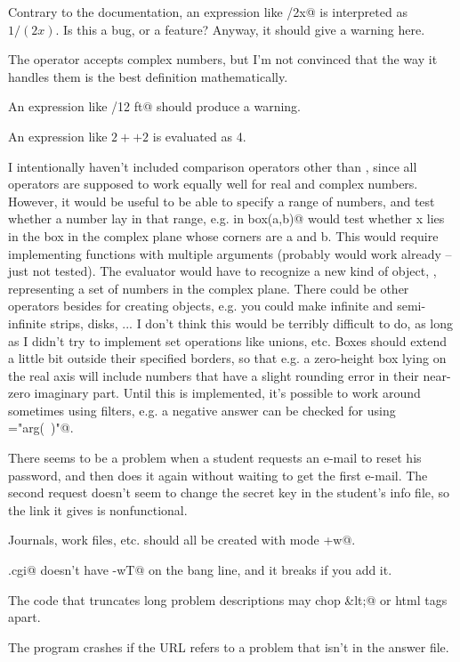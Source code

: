 \documentclass{doc}
\begin{document}
Contrary to the documentation, an expression like /2x@ is interpreted as
$1/(2x)$. Is this a bug, or a feature? Anyway, it should give a warning here.

The \verb@mod@ operator accepts complex numbers, but I'm not convinced that
the way it handles them is the best definition mathematically.

An expression like /12 ft@ should produce a warning.

An expression like $2++2$ is evaluated as 4.

I intentionally haven't included comparison operators other than \verb@eq@, since all operators are
supposed to work equally well for real and complex numbers. However, it would be useful to be able
to specify a range of numbers, and test whether a number lay in that range, e.g.
\verb@x in box(a,b)@ would test whether x lies in the box in the complex plane whose corners are a and b.
This would require implementing functions with multiple arguments (probably would work already --
just not tested). The evaluator would have to recognize a new kind of object, \verb@Set@,
representing a set of numbers in the complex plane.
There could be other operators besides \verb@box@ for creating \verb@Set@ objects, e.g. 
you could make infinite and semi-infinite strips, disks, ... I don't think this would be
terribly difficult to do, as long as I didn't try to implement set operations like unions, etc.
Boxes should extend a little bit outside
their specified borders, so that e.g. a zero-height box lying on the real axis will include numbers
that have a slight rounding error in their near-zero imaginary part. 
Until this is implemented, it's possible to work around sometimes using
filters, e.g. a negative answer can be checked for using \verb@filter="arg(~)"@.

There seems to be a problem when a student requests an e-mail to reset his password,
and then does it again without waiting to get the first e-mail. The second request
doesn't seem to change the secret key in the student's info file, so the link it
gives is nonfunctional.

Journals, work files, etc. should all be created with mode \verb@g+w@.

\verb@Spotter.cgi@ doesn't have \verb@-wT@ on the bang line, and it breaks
if you add it.

The code that truncates long problem descriptions may chop \verb@&lt;@ or html tags apart.

The program crashes if the URL refers to a problem that isn't in the answer file.
\end{document}
